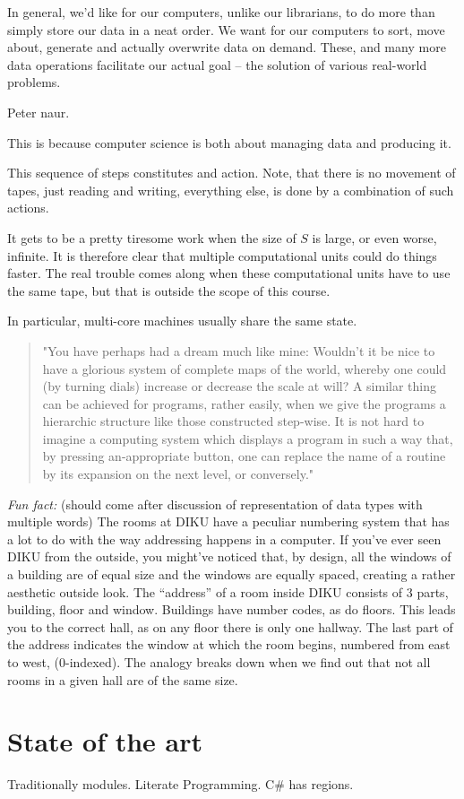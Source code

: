 
In general, we'd like for our computers, unlike our librarians, to do more than
simply store our data in a neat order. We want for our computers to sort, move
about, generate and actually overwrite data on demand. These, and many more
data operations facilitate our actual goal -- the solution of various
real-world problems.

Peter naur.

This is because computer science is both about
managing data and producing it. 

This sequence of steps constitutes and action. Note, that there is no movement
of tapes, just reading and writing, everything else, is done by a combination
of such actions.


It gets to be a pretty tiresome work when the size of
$S$ is large, or even worse, infinite. It is therefore clear that multiple computational
units could do things faster. The real trouble comes along when these
computational units have to use the same tape, but that is outside the scope of
this course.

In particular, multi-core machines usually share the same state.




\begin{quote}"You have perhaps had a dream much like mine: Wouldn't it be nice
to have a glorious system of complete maps of the world, whereby one could (by
turning dials) increase or decrease the scale at will? A similar thing can be
achieved for programs, rather easily, when we give the programs a hierarchic
structure like those constructed step-wise. It is not hard to imagine a
computing system which displays a program in such a way that, by pressing
an-appropriate button, one can replace the name of a routine by its expansion
on the next level, or conversely."\cite{knuth-review-of-sp}\end{quote}

\emph{Fun fact:} (should come after discussion of representation of data types
with multiple words) The rooms at DIKU have a peculiar numbering system that
has a lot to do with the way addressing happens in a computer. If you've ever
seen DIKU from the outside, you might've noticed that, by design, all the
windows of a building are of equal size and the windows are equally spaced,
creating a rather aesthetic outside look. The ``address'' of a room inside DIKU
consists of 3 parts, building, floor and window. Buildings have number codes,
as do floors. This leads you to the correct hall, as on any floor there is only
one hallway. The last part of the address indicates the window at which the
room begins, numbered from east to west, (0-indexed). The analogy breaks down
when we find out that not all rooms in a given hall are of the same size.



\section{State of the art}

Traditionally modules. Literate Programming. C\# has regions.


